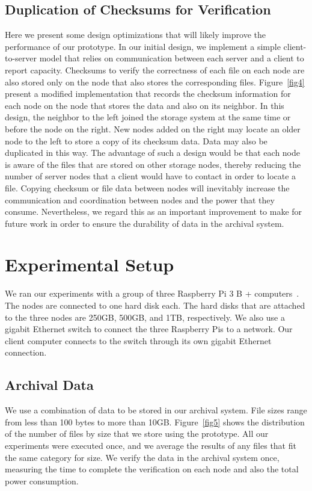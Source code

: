 \subsection{Duplication of Checksums for Verification}
Here we present some design optimizations that will likely improve the performance of our prototype.  In our initial design, we implement a simple client-to-server model that relies on communication between each server and a client to report capacity.  Checksums to verify the correctness of each file on each node are also stored only on the node that also stores the corresponding files.  Figure~\ref{fig4} present a modified implementation that records the checksum information for each node on the node that stores the data and also on its neighbor.  In this design, the neighbor to the left joined the storage system at the same time or before the node on the right.  New nodes added on the right may locate an older node to the left to store a copy of its checksum data.  Data may also be duplicated in this way.  The advantage of such a design would be that each node is aware of the files that are stored on other storage nodes, thereby reducing the number of server nodes that a client would have to contact in order to locate a file.  Copying checksum or file data between nodes will inevitably increase the communication and coordination between nodes and the power that they consume.  Nevertheless, we regard this as an important improvement to make for future work in order to ensure the durability of data in the archival system.

\section{Experimental Setup}
We ran our experiments with a group of three Raspberry Pi 3 B + computers~\cite{web49}.  The nodes are connected to one hard disk each.  The hard disks that are attached to the three nodes are 250GB, 500GB, and 1TB, respectively.  We also use a gigabit Ethernet switch to connect the three Raspberry Pis to a network.  Our client computer connects to the switch through its own gigabit Ethernet connection.

\subsection{Archival Data}
We use a combination of data to be stored in our archival system.  File sizes range from less than 100 bytes to more than 10GB.  Figure~\ref{fig5} shows the distribution of the number of files by size that we store using the prototype.  All our experiments were executed once, and we average the results of any files that fit the same category for size.  We verify the data in the archival system once, measuring the time to complete the verification on each node and also the total power consumption.


